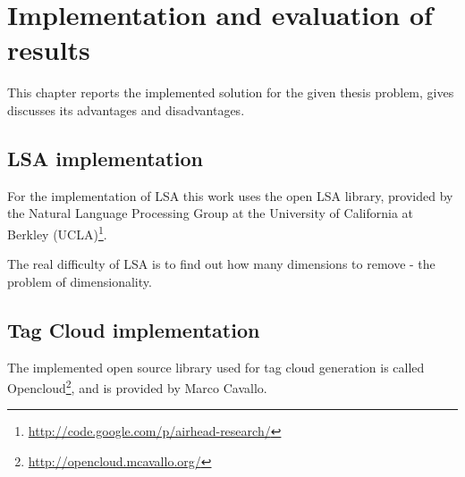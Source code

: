 \chapter{Implementation and evaluation of results}
\label{sec:implementation}

\begin{summary}
This chapter reports the implemented solution for the given thesis problem, gives discusses its advantages and disadvantages.
\end{summary}

\section{LSA implementation}
\label{sec:implementation:lsa_impl}
For the implementation of LSA this work uses the open LSA library, provided by the Natural Language Processing Group at the University of California at Berkley (UCLA)\footnote{\url{http://code.google.com/p/airhead-research/}}.

The real difficulty of LSA is to find out how many dimensions to remove - the problem of dimensionality.

\section{Tag Cloud implementation}
\label{sec:implementation:tag_cloud}
The implemented open source library used for tag cloud generation is called Opencloud\footnote{\url{http://opencloud.mcavallo.org/}}, and is provided by Marco Cavallo.
